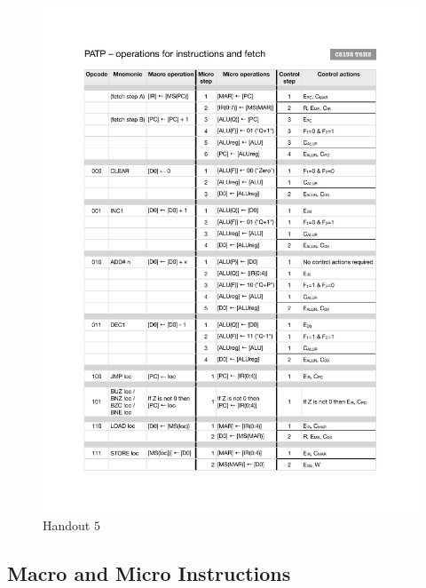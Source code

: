\documentclass[a4paper]{article}
\theoremstyle{plain}
\theoremstyle{definition}
\theoremstyle{remark}
\begin{document}
\begin{figure}[H]
	\centering
	\includegraphics[width=1\textwidth]{PATP/5.pdf}
	\caption{Handout $5$}
	\label{fig:PATP-5-pdf}
\end{figure}

\subsection{Macro and Micro Instructions}
\end{document}
